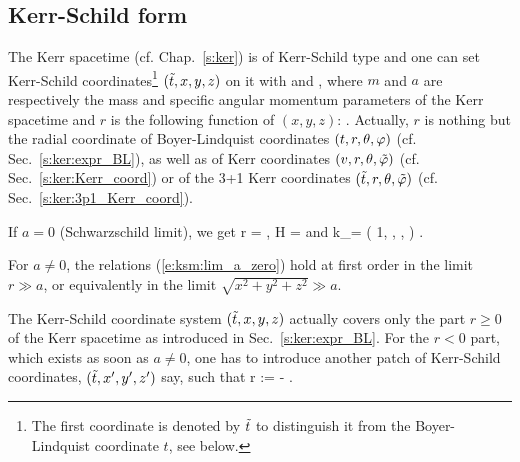 \subsection{Kerr-Schild form}

The Kerr spacetime (cf. Chap.~\ref{s:ker}) is of Kerr-Schild type
and one can set Kerr-Schild coordinates\footnote{The first coordinate
is denoted by ${\tilde t}$ to distinguish it from the Boyer-Lindquist coordinate $t$,
see below.} $({\tilde t}, x, y, z)$ on it with
\be \label{e:ksm:H_Kerr}
\ee
and
\be \label{e:ksm:k_a_Kerr}
    ,
\ee
where $m$ and $a$ are respectively the mass and specific angular momentum
parameters of the Kerr spacetime and
$r$ is the following function of $(x,y,z)$:
\be \label{e:ksm:def_r}
    .
\ee
Actually, $r$ is nothing but the
radial coordinate of Boyer-Lindquist coordinates $(t,r,\theta,\varphi)$
(cf. Sec.~\ref{s:ker:expr_BL}),
as well as of Kerr coordinates $(v, r, \theta, {\tilde\varphi})$ (cf. Sec.~\ref{s:ker:Kerr_coord})
or of the 3+1 Kerr coordinates $({\tilde t}, r, \theta,{\tilde\varphi})$ (cf. Sec.~\ref{s:ker:3p1_Kerr_coord}).

\begin{remark}
If $a=0$ (Schwarzschild limit), we get
\be \label{e:ksm:lim_a_zero}
    r = , \quad
    H =  \quad\mbox{and}\quad
    k_\alpha = \left( 1,\; ,\; ,\;  \right) .
\ee
\end{remark}

\begin{remark}
For $a \not = 0$, the relations (\ref{e:ksm:lim_a_zero}) hold at first order
in the limit $r \gg a$, or equivalently in the limit $\sqrt{x^2 + y^2 + z^2} \gg a$.
\end{remark}

The Kerr-Schild coordinate system $({\tilde t},x,y,z)$ actually covers only
the part $r\geq 0$ of the Kerr spacetime as introduced in Sec.~\ref{s:ker:expr_BL}.
For the $r<0$ part, which exists as soon as $a\not=0$,
one has to introduce another patch of Kerr-Schild coordinates, $({\tilde t},x',y',z')$ say, such
that
\be
    r := -  .
\ee


